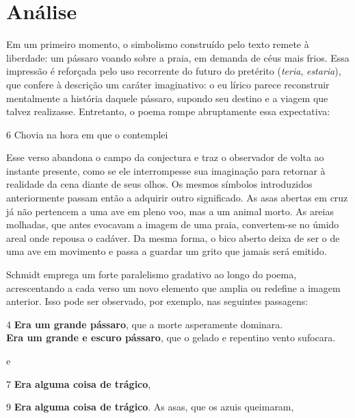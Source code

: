 \section{Análise}

Em um primeiro momento, o simbolismo construído pelo texto remete à liberdade:
um pássaro voando sobre a praia, em demanda de céus mais frios. Essa impressão
é reforçada pelo uso recorrente do futuro do pretérito (\textit{teria},
\textit{estaria}), que confere à descrição um caráter imaginativo: o eu lírico
parece reconstruir mentalmente a história daquele pássaro, supondo seu destino
e a viagem que talvez realizasse. Entretanto, o poema rompe abruptamente essa
expectativa:

\begin{poemquote}[0.80\textwidth]{6}
  Chovia na hora em que o contemplei
\end{poemquote}

Esse verso abandona o campo da conjectura e traz o observador de volta ao
instante presente, como se ele interrompesse sua imaginação para retornar à
realidade da cena diante de seus olhos. Os mesmos símbolos introduzidos
anteriormente passam então a adquirir outro significado. As asas abertas em
cruz já não pertencem a uma ave em pleno voo, mas a um animal morto. As areias
molhadas, que antes evocavam a imagem de uma praia, convertem-se no úmido areal
onde repousa o cadáver. Da mesma forma, o bico aberto deixa de ser o de uma ave
em movimento e passa a guardar um grito que jamais será emitido.

Schmidt emprega um forte paralelismo gradativo ao longo do poema, acrescentando
a cada verso um novo elemento que amplia ou redefine a imagem anterior. Isso
pode ser observado, por exemplo, nas seguintes passagens:

\begin{poemquote}[0.80\textwidth]{4}
  \textbf{Era um grande pássaro}, que a morte asperamente dominara. \\
  \textbf{Era um grande e escuro pássaro}, que o gelado e repentino vento sufocara.
\end{poemquote}

e

\begin{poemquote}[0.80\textwidth]{7}
  \textbf{Era alguma coisa de trágico},
\end{poemquote}
\begin{poemquote}[0.80\textwidth]{9}
  \textbf{Era alguma coisa de trágico}. As asas, que os azuis queimaram,
\end{poemquote}

